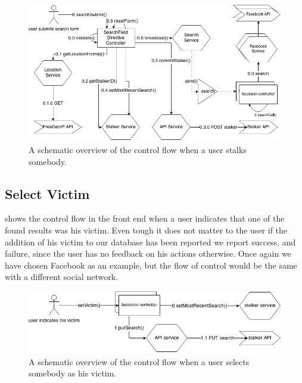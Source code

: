 		\begin{figure}
			\includegraphics[width=\textwidth]{./img/1_stalking_flow}
			\caption{A schematic overview of the control flow when a user stalks somebody.}
			\label{fig:1:controlflowStalk}
		\end{figure}	

\subsection{Select Victim}
	 shows the control flow in the front end when a user indicates that one of the found results was his victim. Even tough it does not matter to the user if the addition of his victim to our database has been reported we report success, and failure, since the user has no feedback on his actions otherwise. Once again we have chosen Facebook as an example, but the flow of control would be the same with a different social network. 

		\begin{figure}
			\includegraphics[width=\textwidth]{./img/1_add_victim_flow}
			\caption{A schematic overview of the control flow when a user selects somebody as his victim.}
			\label{fig:1:controlflowVictim}
		\end{figure}		